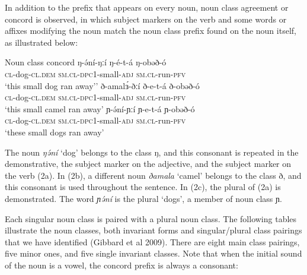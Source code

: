 In addition to the prefix that appears on every noun, noun class agreement or concord is observed, in which subject markers on the verb and some words or affixes modifying the noun match the noun class prefix found on the noun itself, as illustrated below:

\ea	Noun class concord
\ea 
\gll ŋ-ə́ní-ŋːí                 ŋ-é-t-á 	ŋ-obəð-ó	\\
\textsc{cl}-dog-\textsc{cl.dem}    \textsc{sm.cl}-\textsc{dpc1}-small-\textsc{adj}    \textsc{sm.cl}-run-\textsc{pfv}\\
\glt ‘this small dog ran away’’
\ex
\gll ð-amalɜ́-ðːí               ð-e-t-á                        ð-obəð-ó \\
\textsc{cl}-dog-\textsc{cl.dem}    \textsc{sm.cl}-\textsc{dpc1}-small-\textsc{adj}    \textsc{sm.cl}-run-\textsc{pfv}\\
\glt ‘this small camel ran away’
\ex
\gll ɲ-ə́ní-ɲːí                 ɲ-e-t-á                          ɲ-obəð-ó \\
\textsc{cl}-dog-\textsc{cl.dem}    \textsc{sm.cl}-\textsc{dpc1}-small-\textsc{adj}    \textsc{sm.cl}-run-\textsc{pfv}\\
\glt ‘these small dogs ran away’
\z
\z 

The noun \textit{ŋə́ní} ‘dog’ belongs to the class ŋ, and this consonant is repeated in the demonstrative, the subject marker on the adjective, and the subject marker on the verb (2a). In (2b), a different noun \textit{ðamala} ‘camel’ belongs to the class ð, and this consonant is used throughout the sentence. In (2c), the plural of (2a) is demonstrated. The word \textit{ɲə́ní} is the plural ‘dogs’, a member of noun class ɲ.

Each singular noun class is paired with a plural noun class. The following tables illustrate the noun classes, both invariant forms and singular/plural class pairings that we have identified (Gibbard et al 2009). There are eight main class pairings, five minor ones, and five single invariant classes. Note that when the initial sound of the noun is a vowel, the concord prefix is always a consonant:


